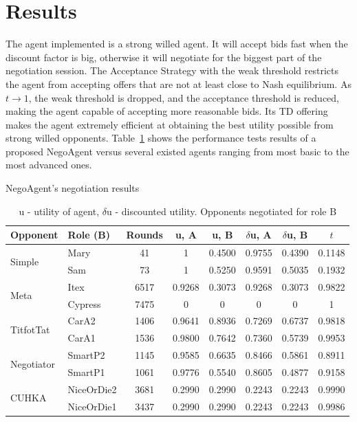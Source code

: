 \documentclass[html]{report}    %
\begin{document}
\section{Results}

The agent implemented is a strong willed agent. It will accept bids fast when the discount factor is big, otherwise it will negotiate for the biggest part of the negotiation session. The Acceptance Strategy with the weak threshold restricts the agent from accepting offers that are not at least close to Nash equilibrium. As $t\to1$, the weak threshold is dropped, and the acceptance threshold is reduced, making the agent capable of accepting more reasonable bids. Its TD offering makes the agent extremely efficient at obtaining the best utility possible from strong willed opponents. Table~\ref{table:NegoSimpleResults} shows the performance tests results of a proposed NegoAgent versus several existed agents ranging from most basic to the most advanced ones.

\begin{table}[htbp] 
	\centering %
	\caption{NegoAgent's negotiation results}
	\setlength{\tabcolsep}{0.5em}
	\begin{tabular}{llcccccc} %
		\toprule[0.15em] 
		 Opponent  &  Role (B) & Rounds & u, A & u, B & $\delta$u, A & $\delta$u, B & $t$\\ [0.5ex] %
		\midrule 
		\multirow{2}{*}{Simple}&Mary&41&1&0.4500&0.9755&0.4390&0.1148\\
		&Sam&73&1&0.5250&0.9591&0.5035&0.1932\\ 
		\midrule
		\multirow{2}{*}{Meta}&Itex&6517&0.9268&0.3073&0.9268&0.3073&0.9822\\
		&Cypress&7475&0&0&0&0&1\\
		\midrule
		\multirow{2}{*}{TitfotTat}&CarA2&1406&0.9641&0.8936&0.7269&0.6737&0.9818\\
		&CarA1&1536&0.9800&0.7642&0.7360&0.5739&0.9953\\
		\midrule
		\multirow{2}{*}{Negotiator}&SmartP2&1145&0.9585&0.6635&0.8466&0.5861&0.8911\\
		&SmartP1&1061&0.9776&0.5540&0.8605&0.4877&0.9158\\
		\midrule
		\multirow{2}{*}{CUHKA}&NiceOrDie2&3681&0.2990&0.2990&0.2243&0.2243&0.9990\\
		&NiceOrDie1&3437&0.2990&0.2990&0.2243&0.2243&0.9986\\
		\bottomrule[0.15em] 
	\end{tabular}
	 
	\caption*{u - utility of agent, $\delta$u - discounted utility. Opponents negotiated for role B} 
	\label{table:NegoSimpleResults} %
\end{table} 
\end{document}
